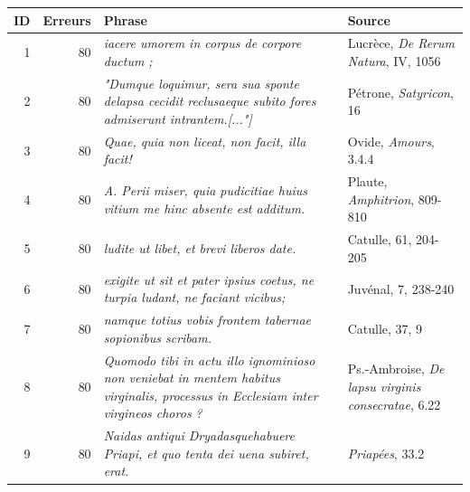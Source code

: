 \begin{table}[]
    \centering
    \small %
    \begin{tabularx}{\textwidth}{|r|r|X|X}
    \toprule
    ID & Erreurs & Phrase & Source                                                                                                                                   \\ \midrule
    1     & 80               & \textit{iacere umorem in corpus de corpore ductum ;}  & Lucrèce, \textit{De Rerum Natura}, IV, 1056                                                                                              \\
    2     & 80               & \textit{"Dumque loquimur, sera sua sponte delapsa cecidit reclusaeque subito fores admiserunt intrantem.{[..."]}} & Pétrone, \textit{Satyricon}, 16                            \\
    3     & 80               & \textit{Quae, quia non liceat, non facit, illa facit!} & Ovide, \textit{Amours}, 3.4.4                                                                                        \\
    4     & 80               & \textit{A. Perii miser, quia pudicitiae huius vitium me hinc absente est additum.}  & Plaute, \textit{Amphitrion}, 809-810                                                             \\
    5     & 80               & \textit{ludite ut libet, et brevi liberos date.}  & Catulle, 61, 204-205                                                                                                \\
    6     & 80               & \textit{exigite ut sit et pater ipsius coetus, ne turpia ludant, ne faciant vicibus;}   & Juvénal, 7, 238-240                                                        \\
    7     & 80               & \textit{namque totius vobis frontem tabernae sopionibus scribam.}   & Catulle, 37, 9                                                                              \\
    8     & 80               & \textit{Quomodo tibi in actu illo ignominioso non veniebat in mentem habitus virginalis, processus in Ecclesiam inter virgineos choros ?} & Ps.-Ambroise, \textit{De lapsu virginis consecratae}, 6.22         \\
    9     & 80               & \textit{Naidas antiqui Dryadasquehabuere Priapi, et quo tenta dei uena subiret, erat.}  & \textit{Priapées}, 33.2                                                  \\

\end{tabularx}
\end{table}
